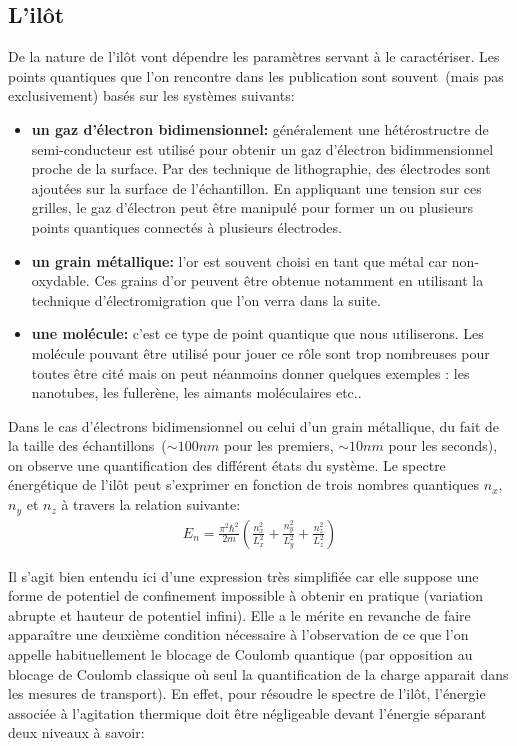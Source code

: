\subsection{L'il\^ot}
De la nature de l'il\^ot vont dépendre les paramètres servant à le caractériser. Les points quantiques que l'on rencontre dans les publication sont souvent~(mais pas exclusivement) basés sur les systèmes suivants:
\begin{itemize}
\item \textbf{un gaz d'électron bidimensionnel:} généralement une hétérostructre de semi-conducteur est utilisé pour obtenir un gaz d'électron bidimmensionnel proche de la surface. Par des technique de lithographie, des électrodes sont ajoutées sur la surface de l'échantillon. En appliquant une tension sur ces grilles, le gaz d'électron peut \^etre manipulé pour former un ou plusieurs points quantiques connectés à plusieurs électrodes.
\item \textbf{un grain métallique:} l'or est souvent choisi en tant que métal car non-oxydable. Ces grains d'or peuvent \^etre obtenue notamment en utilisant la technique d'électromigration que l'on verra dans la suite.
\item \textbf{une molécule:} c'est ce type de point quantique que nous utiliserons. Les molécule pouvant \^etre utilisé pour jouer ce r\^ole sont trop nombreuses pour toutes \^etre cité mais on peut néanmoins donner quelques exemples : les nanotubes, les fullerène, les aimants moléculaires etc.. \newline
\end{itemize}

Dans le cas d'électrons bidimensionnel ou celui d'un grain métallique, du fait de la taille des échantillons~($\sim 100nm$ pour les premiers, $\sim 10nm$ pour les seconds), on observe une quantification des différent états du système. Le spectre énergétique de l'il\^ot peut s'exprimer en fonction de trois nombres quantiques $n_x$,$n_y$ et $n_z$ à travers la relation suivante:
\begin{eqnarray}
E_n = \frac{\pi^2 \hbar^2}{2m}(\frac{n_x^2}{L_x^2} + \frac{n_y^2}{L_y^2} + \frac{n_z^2}{L_z^2}) \nonumber
\end{eqnarray}


Il s'agit bien entendu ici d'une expression très simplifiée car elle suppose une forme de potentiel de confinement impossible à obtenir en pratique (variation abrupte et hauteur de potentiel infini). Elle a le mérite en revanche de faire appara\^itre une deuxième condition nécessaire à l'observation de ce que l'on appelle habituellement le blocage de Coulomb quantique (par opposition au blocage de Coulomb classique où seul la quantification de la charge apparait dans les mesures de transport). En effet, pour résoudre le spectre de l'il\^ot, l'énergie associée à l'agitation thermique doit \^etre négligeable devant l'énergie séparant deux niveaux à savoir:


